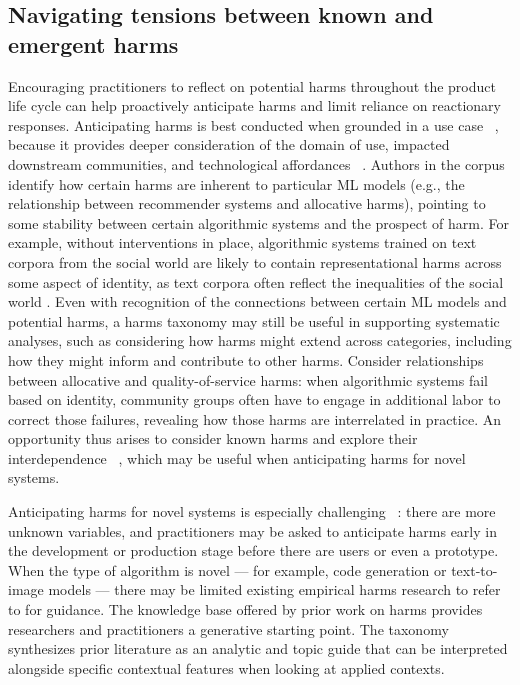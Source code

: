 \subsection{Navigating tensions between known and emergent harms} 
Encouraging practitioners to reflect on potential harms throughout the product life cycle can help proactively anticipate harms and limit reliance on reactionary responses. Anticipating harms is best conducted when grounded in a use case ~\cite{Emanuel_Moss_2020, Floridi_Strait_2020, Shilton_2015}, because it provides deeper consideration of the domain of use, impacted downstream communities, and technological affordances ~\cite{Boyarskaya_2020}. Authors in the corpus identify how certain harms are inherent to particular ML models (e.g., the relationship between recommender systems and allocative harms), pointing to some stability between certain algorithmic systems and the prospect of harm. For example, without interventions in place, algorithmic systems trained on text corpora from the social world are likely to contain representational harms across some aspect of identity, as text corpora often reflect the inequalities of the social world \cite{caliskan2017semantics}. Even with recognition of the connections between certain ML models and potential harms, a harms taxonomy may still be useful in supporting systematic analyses, such as considering how harms might extend across categories, including how they might inform and contribute to other harms. Consider relationships between allocative and quality-of-service harms: when algorithmic systems fail based on identity, community groups often have to engage in additional labor to correct those failures, revealing how those harms are interrelated in practice. An opportunity thus arises to consider known harms and explore their interdependence ~\cite{dobbe2022}, which may be useful when anticipating harms for novel systems. 

Anticipating harms for novel systems is especially challenging ~\cite{Boyarskaya_2020}: there are more unknown variables, and practitioners may be asked to anticipate harms early in the development or production stage before there are users or even a prototype. When the type of algorithm is novel — for example, code generation or text-to-image models — there may be limited existing empirical harms research to refer to for guidance. The knowledge base offered by prior work on harms provides researchers and practitioners a generative starting point. The taxonomy synthesizes prior literature as an analytic and topic guide that can be interpreted alongside specific contextual features when looking at applied contexts. %

